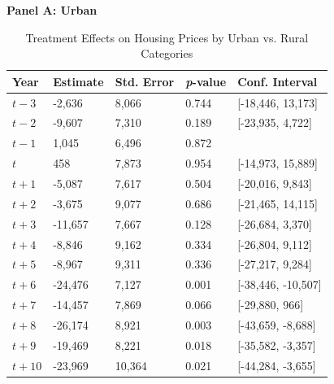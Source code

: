 \begin{table}[htbp]
    \centering
    \caption{Treatment Effects on Housing Prices by Urban vs. Rural Categories}
    \label{tab:urban_rural_results}
    \begin{threeparttable}
    \small

    \textbf{Panel A: Urban} \\[4pt]
    \begin{tabularx}{\textwidth}{l*{4}{X}}
    \hline
    \textbf{Year} & \textbf{Estimate} & \textbf{Std. Error} & \textbf{\textit{p}-value} & \textbf{Conf. Interval} \\
    \hline
    $t - 3$  & -2,636  & 8,066  & 0.744 & [-18,446, 13,173] \\
    $t - 2$  & -9,607  & 7,310  & 0.189 & [-23,935, 4,722] \\
    $t - 1$  & 1,045   & 6,496  & 0.872 &  \\
    $t$  & 458     & 7,873  & 0.954 & [-14,973, 15,889] \\
    $t + 1$  & -5,087  & 7,617  & 0.504 & [-20,016, 9,843] \\
    $t + 2$  & -3,675  & 9,077  & 0.686 & [-21,465, 14,115] \\
    $t + 3$  & -11,657 & 7,667  & 0.128 & [-26,684, 3,370] \\
    $t + 4$  & -8,846  & 9,162  & 0.334 & [-26,804, 9,112] \\
    $t + 5$  & -8,967  & 9,311  & 0.336 & [-27,217, 9,284] \\
    $t + 6$  & -24,476 & 7,127  & 0.001 & [-38,446, -10,507] \\
    $t + 7$  & -14,457 & 7,869  & 0.066 & [-29,880, 966] \\
    $t + 8$  & -26,174 & 8,921  & 0.003 & [-43,659, -8,688] \\
    $t + 9$  & -19,469 & 8,221  & 0.018 & [-35,582, -3,357] \\
    $t + 10$ & -23,969 & 10,364 & 0.021 & [-44,284, -3,655] \\
    \hline
    \end{tabularx}

    \vspace{8pt}



\end{threeparttable}
\end{table}
